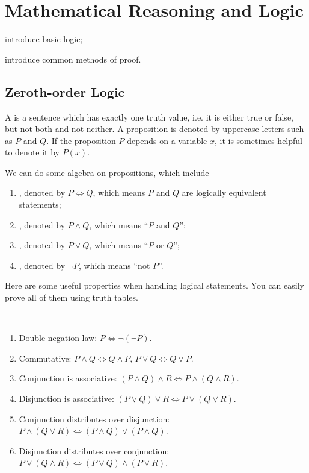 \chapter{Mathematical Reasoning and Logic}\label{chap:logic-proofs}

\begin{learn}
\item introduce basic logic;
\item introduce common methods of proof.
\end{learn}

\section{Zeroth-order Logic}
A  is a sentence which has exactly one truth value, i.e. it is either true or false, but not both and not neither. A proposition is denoted by uppercase letters such as $P$ and $Q$. If the proposition $P$ depends on a variable $x$, it is sometimes helpful to denote it by $P(x)$. 

We can do some algebra on propositions, which include
\begin{enumerate}[label=(\roman*)]
\item {}, denoted by $P\iff Q$, which means $P$ and $Q$ are logically equivalent statements;

\item {}, denoted by $P\land Q$, which means ``$P$ and $Q$'';

\item {}, denoted by $P\lor Q$, which means ``$P$ or $Q$'';

\item {}, denoted by $\lnot P$, which means ``not $P$''.
\end{enumerate}

Here are some useful properties when handling logical statements. You can easily prove all of them using truth tables.
\begin{proposition} \
\begin{enumerate}[label=(\roman*)]
\item Double negation law: $P\iff\lnot(\lnot P)$.
\item Commutative: $P \land Q \iff Q \land P$, $P \lor Q \iff Q \lor P$.
\item Conjunction is associative: $(P\land Q)\land R \iff P\land (Q\land R)$.
\item Disjunction is associative: $(P\lor Q)\lor R \iff P\lor (Q\lor R)$.
\item Conjunction distributes over disjunction: $P\land(Q\lor R) \iff (P\land Q)\lor(P\land Q)$.
\item Disjunction distributes over conjunction: $P\lor(Q\land R) \iff (P\lor Q)\land(P\lor R)$.
\end{enumerate}
\end{proposition}

